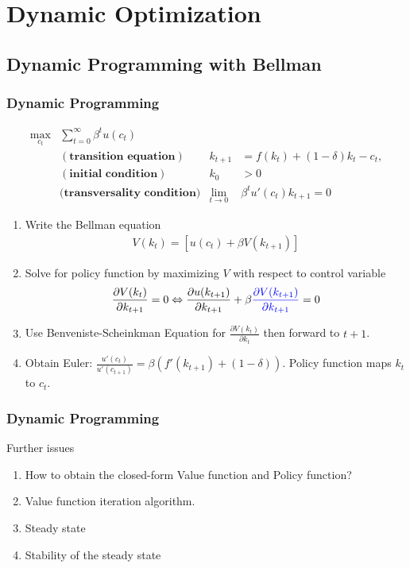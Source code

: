 \documentclass[
10pt, %
]{beamer}
\newcommand{\blue}[1]{\textcolor{blue}{#1}}
\begin{document}
\section{Dynamic Optimization}
\subsection{Dynamic Programming with Bellman}
\begin{frame}
	\frametitle{Dynamic Programming}
	\begin{align*}
		\max_{c_t} & \sum^\infty_{t=0}  \beta^t u(c_t) \\
		&(\textbf{transition equation}) & k_{t+1} &= f(k_t) + (1-\delta)k_t - c_t, \\
		&(\textbf{initial condition}) & k_0 &> 0 \\
		&(\textbf{transversality condition)} & \lim_{t\to 0} & \beta^t u'(c_t) k_{t+1} = 0
	\end{align*}
\begin{enumerate}
\item Write the Bellman equation
		\begin{align}
			V(k_t) =  \left[ u(c_t) + \beta V(k_{t+1}) \right] \label{eq:bellman}
		\end{align}
\item Solve for policy function by maximizing $V$ with respect to control variable
\begin{align*}
			\frac{\partial V(k_t)}{\partial k_{t+1}} = 0 \Leftrightarrow \frac{\partial u(k_{t+1})}{\partial k_{t+1}} + \beta \blue{\frac{\partial V(k_{t+1})}{\partial k_{t+1}}} = 0 
		\end{align*}
\item Use Benveniste-Scheinkman Equation for $\frac{\partial V(k_t)}{\partial k_t}$ then forward to $t+1$.
\item Obtain Euler: $\frac{u'(c_t)}{u'(c_{t+1})} = \beta (f'(k_{t+1}) + (1-\delta))$. Policy function maps $k_t$ to $c_t$.
\end{enumerate}
\end{frame}

\begin{frame}
	\frametitle{Dynamic Programming}
	Further issues
	\begin{enumerate}
		\item How to obtain the closed-form Value function and Policy function?
		\item Value function iteration algorithm.
		\item Steady state
		\item Stability of the steady state
	\end{enumerate}
\end{frame}
\end{document}
